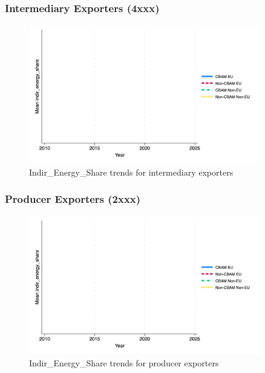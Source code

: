 \documentclass{article}
\begin{document}
\subsubsection{Intermediary Exporters (4xxx)}
\begin{figure}[h!]
\centering
\includegraphics[width=0.9\textwidth]{indir_energy_share_ei.png}
\caption{Indir_Energy_Share trends for intermediary exporters}
\label{fig:indir_energy_share_ei}
\end{figure}

\subsubsection{Producer Exporters (2xxx)}
\begin{figure}[h!]
\centering
\includegraphics[width=0.9\textwidth]{indir_energy_share_ep.png}
\caption{Indir_Energy_Share trends for producer exporters}
\label{fig:indir_energy_share_ep}
\end{figure}
\end{document}
